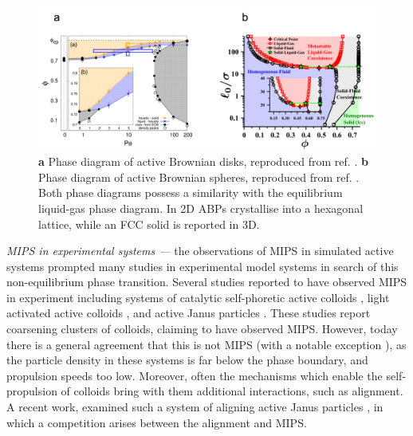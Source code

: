  
\begin{figure}
	\includegraphics[width=\linewidth]{chapters/activeMatter/figsActiveMatter/figPhaseDiagrams}
	\centering
	\caption[Phase diagram of active Brownian particles]{\textbf{a} Phase diagram of active Brownian disks, reproduced from ref. \cite{digregorio2018}. \textbf{b} Phase diagram of active Brownian spheres, reproduced from ref. \cite{omar2021a}. Both phase diagrams possess a similarity with the equilibrium liquid-gas phase diagram. In 2D ABPs crystallise into a hexagonal lattice, while an FCC solid is reported in 3D.}
	\label{fig:2D_3D_phaseDiagram}	
\end{figure}
 
 
\textit{MIPS in experimental systems ---} the observations of MIPS in simulated active systems prompted many studies in experimental model systems in search of this non-equilibrium phase transition. Several studies reported to have observed MIPS in experiment including systems of catalytic self-phoretic active colloids \cite{theurkauff2012}, light activated active colloids \cite{palacci2013}, and active Janus particles \cite{buttinoni2013}. These studies report coarsening clusters of colloids, claiming to have observed MIPS. However, today there is a general agreement that this is not MIPS (with a notable exception \cite{liu2019a}), as the particle density in these systems is far below the phase boundary, and propulsion speeds too low. 
Moreover, often the mechanisms which enable the self-propulsion of colloids bring with them additional interactions, such as alignment. A recent work, examined such a system of aligning active Janus particles \cite{vanderlinden2019}, in which a competition arises between the alignment and MIPS. 

